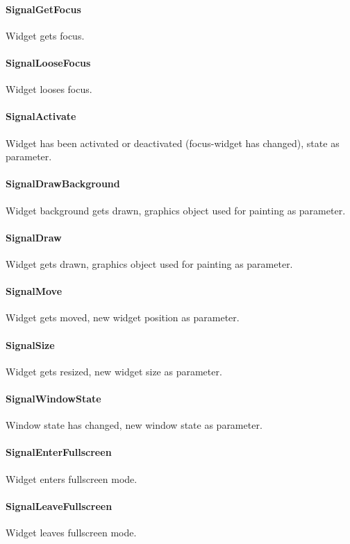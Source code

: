 \paragraph{SignalGetFocus}
Widget gets focus.

\paragraph{SignalLooseFocus}
Widget looses focus.

\paragraph{SignalActivate}
Widget has been activated or deactivated (focus-widget has changed), state as parameter.

\paragraph{SignalDrawBackground}
Widget background gets drawn, graphics object used for painting as parameter.

\paragraph{SignalDraw}
Widget gets drawn, graphics object used for painting as parameter.

\paragraph{SignalMove}
Widget gets moved, new widget position as parameter.

\paragraph{SignalSize}
Widget gets resized, new widget size as parameter.

\paragraph{SignalWindowState}
Window state has changed, new window state as parameter.

\paragraph{SignalEnterFullscreen}
Widget enters fullscreen mode.

\paragraph{SignalLeaveFullscreen}
Widget leaves fullscreen mode.

